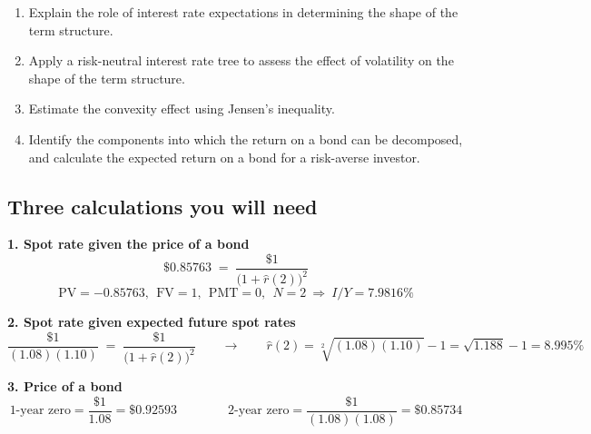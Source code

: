 
\begin{mrkeybox}[title={Learning objectives in this reading}]
\small
\begin{enumerate}[label=\textbf{\alph*.},leftmargin=1.7em]
\item Explain the role of interest rate expectations in determining the shape of the term
      structure.
\item Apply a risk-neutral interest rate tree to assess the effect of volatility on the shape of
      the term structure.
\item Estimate the convexity effect using Jensen's inequality.
\item Identify the components into which the return on a bond can be decomposed, and calculate
      the expected return on a bond for a risk-averse investor.
\end{enumerate}
\end{mrkeybox}


\subsection{Three calculations you will need}

\begin{mrfmlbox}
\textbf{1. Spot rate given the price of a bond}
\[ \$0.85763 \;=\; \frac{\$1}{\bigl(1 + \hat{r}(2)\bigr)^{2}} \]
\vspace{-10pt}
\[ \text{PV} = -0.85763,\ \ \text{FV} = 1,\ \ \text{PMT} = 0,\ \ N = 2
   \ \Rightarrow\ I/Y = \mathbf{7.9816\%} \]
\vspace{-4pt}

\medskip
\textbf{2. Spot rate given expected future spot rates}
\[ \frac{\$1}{(1.08)(1.10)} \;=\; \frac{\$1}{\bigl(1+\hat{r}(2)\bigr)^{2}}
   \qquad\longrightarrow\qquad
   \hat{r}(2) = \sqrt[2]{(1.08)(1.10)} - 1 = \sqrt{1.188} - 1 = \mathbf{8.995\%} \]
\vspace{-4pt}

\medskip
\textbf{3. Price of a bond}
\[ \text{1-year zero} = \frac{\$1}{1.08} = \$0.92593
   \qquad\qquad
   \text{2-year zero} = \frac{\$1}{(1.08)(1.08)} = \$0.85734 \]
\end{mrfmlbox}

